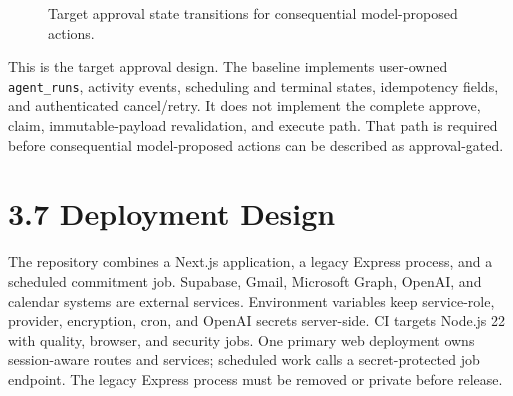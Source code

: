 \documentclass[
]{report}
\begin{document}
\begin{figure}[htbp]
\centering
{}
\caption{Target approval state transitions for consequential model-proposed actions.}
\label{fig:approval-state}
\end{figure}

This is the target approval design. The baseline implements user-owned
\texttt{agent\_runs}, activity events, scheduling and terminal states,
idempotency fields, and authenticated cancel/retry. It does not implement
the complete approve, claim, immutable-payload revalidation, and execute
path. That path is required before consequential model-proposed actions
can be described as approval-gated.

\section{3.7 Deployment Design}\label{37-deployment-design}

The repository combines a Next.js application, a legacy Express process,
and a scheduled commitment job. Supabase, Gmail, Microsoft Graph,
OpenAI, and calendar systems are external services. Environment
variables keep service-role, provider, encryption, cron, and OpenAI
secrets server-side. CI targets Node.js 22 with quality, browser, and
security jobs. One primary web deployment owns session-aware routes and
services; scheduled work calls a secret-protected job endpoint. The
legacy Express process must be removed or private before release.
\end{document}

